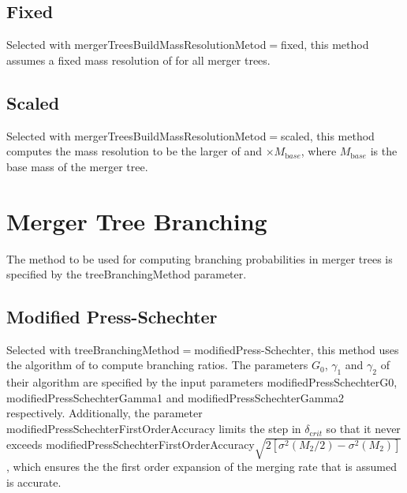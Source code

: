 \subsection{Fixed}

Selected with {\normalfont \ttfamily mergerTreesBuildMassResolutionMetod}$=${\normalfont \ttfamily fixed}, this method assumes a fixed mass resolution of {\normalfont \ttfamily [mergerTreeBuildMassResolutionFixed]} for all merger trees.

\subsection{Scaled}

Selected with {\normalfont \ttfamily mergerTreesBuildMassResolutionMetod}$=${\normalfont \ttfamily scaled}, this method computes the mass resolution to be the larger of {\normalfont \ttfamily [mergerTreeBuildMassResolutionScaledMinimum]} and {\normalfont \ttfamily [mergerTreeBuildMassResolutionScaledFraction]}$\times M_{\mathrm base}$, where $M_{\mathrm base}$ is the base mass of the merger tree.

\section{Merger Tree Branching}

The method to be used for computing branching probabilities in merger trees is specified by the {\normalfont \ttfamily treeBranchingMethod} parameter.

\subsection{Modified Press-Schechter}

Selected with {\normalfont \ttfamily treeBranchingMethod}$=${\normalfont \ttfamily modifiedPress-Schechter}, this method uses the algorithm of \cite{parkinson_generating_2008} to compute branching ratios. The parameters $G_0$, $\gamma_1$ and $\gamma_2$ of their algorithm are specified by the input parameters {\normalfont \ttfamily modifiedPressSchechterG0}, {\normalfont \ttfamily modifiedPressSchechterGamma1} and {\normalfont \ttfamily modifiedPressSchechterGamma2} respectively. Additionally, the parameter {\normalfont \ttfamily modifiedPressSchechterFirstOrderAccuracy} limits the step in $\delta_{\mathrm crit}$ so that it never exceeds {\normalfont \ttfamily modifiedPressSchechterFirstOrderAccuracy}$\sqrt{2[\sigma^2(M_2/2)-\sigma^2(M_2)]}$, which ensures the the first order expansion of the merging rate that is assumed is accurate.

